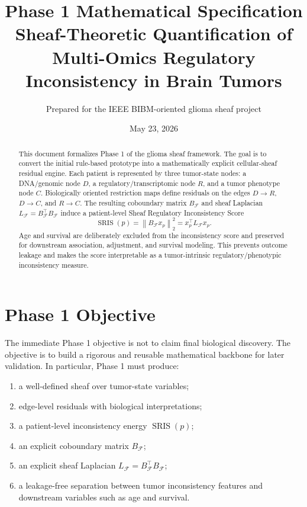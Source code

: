 \documentclass[11pt]{article}
\title{\vspace{-0.5in}\textbf{Phase 1 Mathematical Specification}\\
\large Sheaf-Theoretic Quantification of Multi-Omics Regulatory Inconsistency in Brain Tumors}
\author{Prepared for the IEEE BIBM-oriented glioma sheaf project}
\date{May 23, 2026}
\newcommand{\BF}{B_{\mathcal{F}}}
\newcommand{\LF}{L_{\mathcal{F}}}
\newcommand{\SRIS}{\operatorname{SRIS}}
\newcommand{\norm}[1]{\left\lVert #1 \right\rVert}
\begin{document}
\maketitle

\begin{abstract}
This document formalizes Phase 1 of the glioma sheaf framework.  The goal is to convert the initial rule-based prototype into a mathematically explicit cellular-sheaf residual engine.  Each patient is represented by three tumor-state nodes: a DNA/genomic node $D$, a regulatory/transcriptomic node $R$, and a tumor phenotype node $C$.  Biologically oriented restriction maps define residuals on the edges $D\to R$, $D\to C$, and $R\to C$.  The resulting coboundary matrix $\BF$ and sheaf Laplacian $\LF=\BF^\top\BF$ induce a patient-level Sheaf Regulatory Inconsistency Score
\[
\SRIS(p)=\norm{\BF x_p}_2^2=x_p^\top \LF x_p.
\]
Age and survival are deliberately excluded from the inconsistency score and preserved for downstream association, adjustment, and survival modeling.  This prevents outcome leakage and makes the score interpretable as a tumor-intrinsic regulatory/phenotypic inconsistency measure.
\end{abstract}

\tableofcontents
\newpage

\section{Phase 1 Objective}

The immediate Phase 1 objective is not to claim final biological discovery.  The objective is to build a rigorous and reusable mathematical backbone for later validation.  In particular, Phase 1 must produce:
\begin{enumerate}[leftmargin=1.2cm]
    \item a well-defined sheaf over tumor-state variables;
    \item edge-level residuals with biological interpretations;
    \item a patient-level inconsistency energy $\SRIS(p)$;
    \item an explicit coboundary matrix $\BF$;
    \item an explicit sheaf Laplacian $\LF=\BF^\top\BF$;
    \item a leakage-free separation between tumor inconsistency features and downstream variables such as age and survival.
\end{enumerate}
\end{document}
